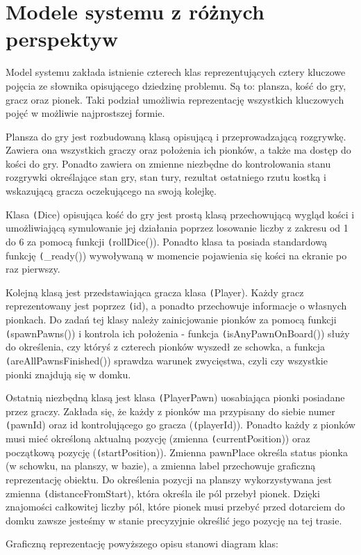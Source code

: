\documentclass[conference]{IEEEtran}
\begin{document}
\section{Modele systemu z różnych perspektyw}
Model systemu zakłada istnienie czterech klas reprezentujących cztery kluczowe pojęcia ze słownika opisującego dziedzinę problemu. Są to: plansza, kość do gry, gracz oraz pionek. Taki podział umożliwia reprezentację wszystkich kluczowych pojęć w możliwie najprostszej formie.\par
Plansza do gry jest rozbudowaną klasą opisującą i przeprowadzającą rozgrywkę. Zawiera ona wszystkich graczy oraz położenia ich pionków, a także ma dostęp do kości do gry. Ponadto zawiera on zmienne niezbędne do kontrolowania stanu rozgrywki określające stan gry, stan tury, rezultat ostatniego rzutu kostką i wskazującą gracza oczekującego na swoją kolejkę.\par
Klasa \texttt(Dice) opisująca kość do gry jest prostą klasą przechowującą wygląd kości i umożliwiającą symulowanie jej działania poprzez losowanie liczby z zakresu od 1 do 6 za pomocą funkcji \texttt(rollDice()). Ponadto klasa ta posiada standardową funkcję \texttt(\_ready()) wywoływaną w momencie pojawienia się kości na ekranie po raz pierwszy.\par
Kolejną klasą jest przedstawiająca gracza klasa \texttt(Player). Każdy gracz reprezentowany jest poprzez \texttt(id), a ponadto przechowuje informacje o własnych pionkach. Do zadań tej klasy należy zainicjowanie pionków za pomocą funkcji \texttt(spawnPawns()) i kontrola ich położenia - funkcja \texttt(isAnyPawnOnBoard()) służy do określenia, czy któryś z czterech pionków wyszedł ze schowka, a funkcja \texttt(areAllPawnsFinished()) sprawdza warunek zwycięstwa, czyli czy wszystkie pionki znajdują się w domku. \par
Ostatnią niezbędną klasą jest klasa \texttt(PlayerPawn) uosabiająca pionki posiadane przez graczy. Zakłada się, że każdy z pionków ma przypisany do siebie numer \texttt(pawnId) oraz id kontrolującego go gracza (\texttt(playerId)). Ponadto każdy z pionków musi mieć określoną aktualną pozycję (zmienna \texttt(currentPosition)) oraz początkową pozycję (\texttt(startPosition)). Zmienna pawnPlace określa status pionka (w schowku, na planszy, w bazie), a zmienna label przechowuje graficzną reprezentację obiektu. Do określenia pozycji na planszy wykorzystywana jest zmienna \texttt(distanceFromStart), która określa ile pól przebył pionek. Dzięki znajomości całkowitej liczby pól, które pionek musi przebyć przed dotarciem do domku zawsze jesteśmy w stanie precyzyjnie określić jego pozycję na tej trasie. \par \newpage
Graficzną reprezentację powyższego opisu stanowi diagram klas:
\end{document}
